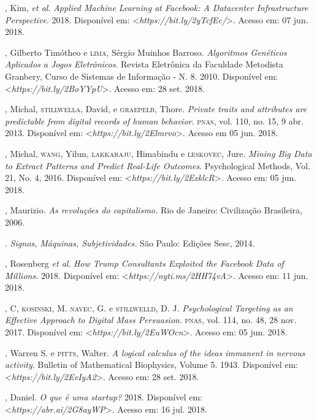 \begin{bibliohedra}
, Kim, \emph{et al}. \emph{Applied Machine Learning at Facebook: A
Datacenter Infrastructure Perspective}. 2018. Disponível em: \textless{}\emph{https://bit.ly/2yTcfEc/}\textgreater{}. Acesso em: 07 jun. 2018.

, Gilberto Timótheo e \textsc{lima}, Sérgio Muinhos Barroso.
\emph{Algoritmos Genéticos Aplicados a Jogos Eletrônicos}. Revista
Eletrônica da Faculdade Metodista Granbery, Curso de Sistemas de
Informação - N. 8. 2010. Disponível em: \textless{}\emph{https://bit.ly/2BoYYpU}\textgreater{}. Acesso em: 28 set. 2018.

, Michal, \textsc{stillwella}, David, e \textsc{graepelb}, Thore.
\emph{Private traits and attributes are predictable from digital
records of human behavior}. \textsc{pnas}, vol. 110, no. 15, 9 abr. 2013.
Disponível em: \textless{}\emph{https://bit.ly/2Elmrvo}\textgreater{}. Acesso em 05 jun. 2018.

, Michal, \textsc{wang}, Yilun, \textsc{lakkaraju}, Himabindu e \textsc{leskovec}, Jure. \emph{Mining Big Data to Extract Patterns and Predict Real-Life
Outcomes}. Psychological Methods, Vol. 21, No. 4, 2016. Disponível em:
\textless{}\emph{https://bit.ly/2ExklcR}\textgreater{}. Acesso em: 05 jun. 2018.

, Maurizio. \emph{As revoluções do capitalismo.} Rio de
Janeiro: Civilização Brasileira, 2006.

\titidem. \emph{Signos, Máquinas, Subjetividades.} São
Paulo: Edições Sesc, 2014.

, Rosenberg \emph{et al}. \emph{How Trump Consultants Exploited the
Facebook Data of Millions.} 2018. Disponível em: \textless{}\emph{https://nyti.ms/2HH74vA}\textgreater{}. Acesso em: 11 jun. 2018.

, C, \textsc{kosinski}, M. \textsc{navec}, G. e \textsc{stillwelld}, D. J.
\emph{Psychological Targeting as an Effective Approach to Digital Mass
Persuasion}. \textsc{pnas}, vol. 114, no. 48, 28 nov. 2017. Disponível em:
\textless{}\emph{https://bit.ly/2EuWOcn}\textgreater{}. Acesso em: 05 jun. 2018.

, Warren S. e \textsc{pitts}, Walter. \emph{A logical calculus of the
ideas immanent in nervous activity}. Bulletin of Mathematical
Biophysics, Volume 5. 1943. Disponível em:
\textless{}\emph{https://bit.ly/2EvIyA2}\textgreater{}. Acesso em: 28 set. 2018.

, Daniel. \emph{O que é uma startup?} 2018. Disponível em:
\textless{}\emph{https://abr.ai/2G8ayWP}\textgreater{}. Acesso em: 16 jul. 2018.


\end{bibliohedra}

